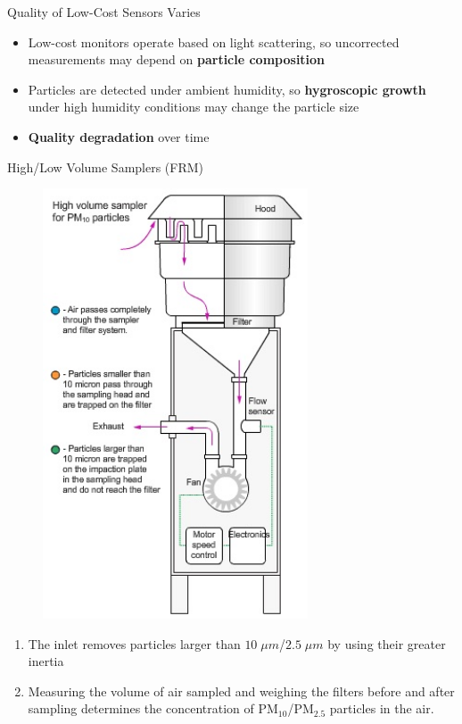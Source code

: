 \documentclass{beamer}
\begin{document}
\begin{frame}{Quality of Low-Cost Sensors Varies}
    \begin{itemize}
        \item Low-cost monitors operate based on light scattering, so uncorrected measurements may depend on \textbf{particle composition}
        \item Particles are detected under ambient humidity, so \textbf{hygroscopic growth} under high humidity conditions may change the particle size
        \item \textbf{Quality degradation} over time
    \end{itemize}
\end{frame}

\begin{frame}{High/Low Volume Samplers (FRM)}
    \begin{minipage}[t]{0.49\textwidth}
        \begin{figure}
        \centering
        \includegraphics[width=0.7\textwidth]{img/appendix/Aim2/hivol-sampler.jpg}
    \end{figure}
    \end{minipage}
    \begin{minipage}[t]{0.49\textwidth}
        \begin{enumerate}
            \item The inlet removes particles larger than $10\;\mu m$/$2.5\;\mu m$ by using their greater inertia
            \item Measuring the volume of air sampled and weighing the filters before and after sampling determines the concentration of PM$_{10}$/PM$_{2.5}$ particles in the air.
        \end{enumerate}
    \end{minipage}
\end{frame}
\end{document}
